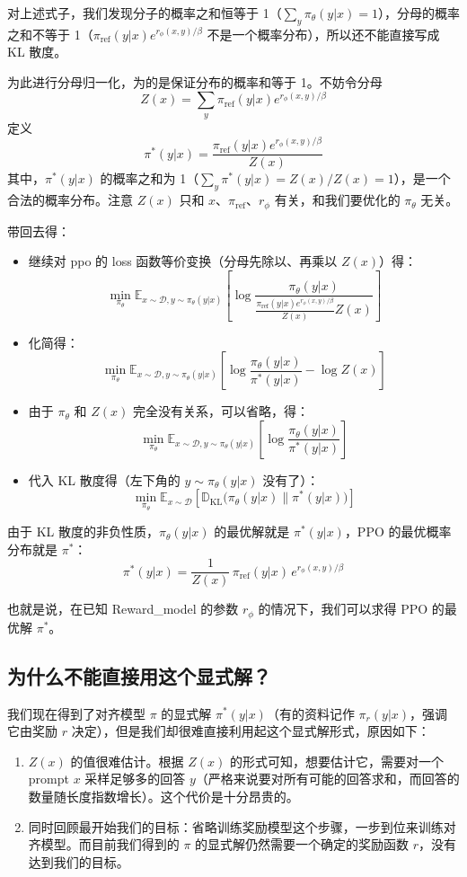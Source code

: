 \documentclass[UTF8,fontset=fandol]{ctexart}
\begin{document}
对上述式子，我们发现分子的概率之和恒等于 1（\(\sum_y \pi_\theta(y|x) = 1\)），分母的概率之和不等于 1（\(\pi_{\text{ref}}(y|x) e^{r_\phi(x,y)/\beta}\) 不是一个概率分布），所以还不能直接写成 KL 散度。

为此进行分母归一化，为的是保证分布的概率和等于 1。不妨令分母
\[
Z(x) = \sum_{y} \pi_{\text{ref}}(y|x) e^{r_\phi(x,y)/\beta}
\]
定义
\[
\pi^*(y|x) = \frac{\pi_{\text{ref}}(y|x) e^{r_\phi(x,y)/\beta}}{Z(x)}
\]
其中，\(\pi^*(y|x)\) 的概率之和为 1（\(\sum_y \pi^*(y|x) = Z(x)/Z(x) = 1\)），是一个合法的概率分布。注意 \(Z(x)\) 只和 \(x\)、\(\pi_{\text{ref}}\)、\(r_\phi\) 有关，和我们要优化的 \(\pi_\theta\) 无关。

带回去得：
\begin{itemize}
\item 继续对 ppo 的 loss 函数等价变换（分母先除以、再乘以 \(Z(x)\)）得：
\[
\min_{\pi_\theta} \mathbb{E}_{x\sim\mathcal{D},y\sim\pi_\theta(y|x)} \left[ \log \frac{\pi_\theta(y|x)}{ \frac{\pi_{\text{ref}}(y|x)e^{r_\phi(x,y)/\beta}}{Z(x)} Z(x) } \right]
\]

\item 化简得：
\[
\min_{\pi_\theta} \mathbb{E}_{x\sim\mathcal{D},y\sim\pi_\theta(y|x)} \left[ \log \frac{\pi_\theta(y|x)}{\pi^*(y|x)} - \log Z(x) \right]
\]

\item 由于 \(\pi_\theta\) 和 \(Z(x)\) 完全没有关系，可以省略，得：
\[
\min_{\pi_\theta} \mathbb{E}_{x\sim\mathcal{D},y\sim\pi_\theta(y|x)} \left[ \log \frac{\pi_\theta(y|x)}{\pi^*(y|x)} \right]
\]

\item 代入 KL 散度得（左下角的 \(y \sim \pi_\theta(y|x)\) 没有了）：
\[
\min_{\pi_\theta} \mathbb{E}_{x\sim\mathcal{D}} \left[ \mathbb{D}_{\mathrm{KL}} \big(\pi_\theta(y|x) \parallel \pi^*(y|x)\big) \right]
\]
\end{itemize}

由于 KL 散度的非负性质，\(\pi_\theta(y|x)\) 的最优解就是 \(\pi^*(y|x)\)，PPO 的最优概率分布就是 \(\pi^*\)：
\[
\boxed{\pi^*(y|x) = \frac{1}{Z(x)}\, \pi_{\text{ref}}(y|x)\, e^{r_\phi(x,y)/\beta}}
\]

也就是说，在已知 Reward\_model 的参数 \(r_\phi\) 的情况下，我们可以求得 PPO 的最优解 \(\pi^*\)。

\subsection{为什么不能直接用这个显式解？}

我们现在得到了对齐模型 \(\pi\) 的显式解 \(\pi^*(y|x)\)（有的资料记作 \(\pi_r(y|x)\)，强调它由奖励 \(r\) 决定），但是我们却很难直接利用起这个显式解形式，原因如下：
\begin{enumerate}
\item \(Z(x)\) 的值很难估计。根据 \(Z(x)\) 的形式可知，想要估计它，需要对一个 prompt \(x\) 采样足够多的回答 \(y\)（严格来说要对所有可能的回答求和，而回答的数量随长度指数增长）。这个代价是十分昂贵的。
\item 同时回顾最开始我们的目标：省略训练奖励模型这个步骤，一步到位来训练对齐模型。而目前我们得到的 \(\pi\) 的显式解仍然需要一个确定的奖励函数 \(r\)，没有达到我们的目标。
\end{enumerate}
\end{document}
